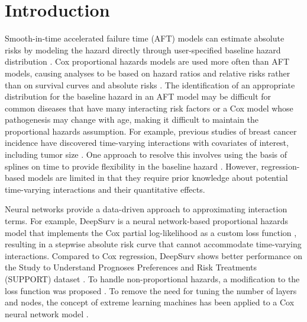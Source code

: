 \documentclass[AMA,STIX1COL,]{WileyNJD-v2}
\begin{document}

\maketitle

\hypertarget{introduction}{%
\section{Introduction}\label{introduction}}

Smooth-in-time accelerated failure time (AFT) models can estimate
absolute risks by modeling the hazard directly through user-specified
baseline hazard distribution \citep{kleinbaum2012survival}. Cox
proportional hazards models are used more often than AFT models, causing
analyses to be based on hazard ratios and relative risks rather than on
survival curves and absolute risks \citep{hanley2009}. The
identification of an appropriate distribution for the baseline hazard in
an AFT model may be difficult for common diseases that have many
interacting risk factors or a Cox model whose pathogenesis may change
with age, making it difficult to maintain the proportional hazards
assumption. For example, previous studies of breast cancer incidence
have discovered time-varying interactions with covariates of interest,
including tumor size \citep{coradini2000time}. One approach to resolve
this involves using the basis of splines on time to provide flexibility
in the baseline hazard \citep{royston2002flexible}. However,
regression-based models are limited in that they require prior knowledge
about potential time-varying interactions and their quantitative
effects.

Neural networks provide a data-driven approach to approximating
interaction terms. For example, DeepSurv is a neural network-based
proportional hazards model that implements the Cox partial
log-likelihood as a custom loss function \citep{katzman2018DeepSurv},
resulting in a stepwise absolute risk curve that cannot accommodate
time-varying interactions. Compared to Cox regression, DeepSurv shows
better performance on the Study to Understand Prognoses Preferences and
Risk Treatments (SUPPORT) dataset \citep{knaus1995SUPPORT}. To handle
non-proportional hazards, a modification to the loss function was
proposed \citep{faraggi1995neural}. To remove the need for tuning the
number of layers and nodes, the concept of extreme learning machines has
been applied to a Cox neural network model \citep{wang2019extreme}.
\end{document}

